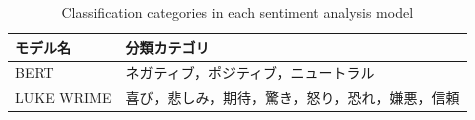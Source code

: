 \begin{table}[htbp]
    \centering
    \caption{Classification categories in each sentiment analysis model}
    \label{tab:emotion_models}
    \begin{tabular}{ll}
    \hline
    モデル名 & 分類カテゴリ \\
    \hline
    \hline
    BERT &
    ネガティブ，ポジティブ，ニュートラル \\
    LUKE WRIME &
    喜び，悲しみ，期待，驚き，怒り，恐れ，嫌悪，信頼 \\
    \hline
    \end{tabular}
\end{table}
